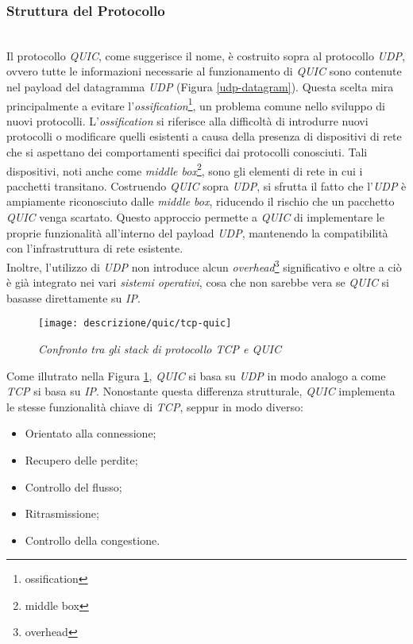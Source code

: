 \subsubsection{Struttura del Protocollo}
~\\ 
\indent Il protocollo \emph{QUIC}, come suggerisce il nome, è costruito sopra al protocollo \emph{UDP}, ovvero tutte le informazioni necessarie al funzionamento di \emph{QUIC} sono contenute nel payload del datagramma \emph{UDP} (Figura \ref{udp-datagram}). 
Questa scelta mira principalmente a evitare l'\emph{ossification}\footnote{\gls{ossification}}, un problema comune nello sviluppo di nuovi protocolli.
L'\emph{ossification} si riferisce alla difficoltà di introdurre nuovi protocolli o modificare quelli esistenti a causa della presenza di dispositivi di rete che si aspettano dei comportamenti specifici dai protocolli conosciuti. Tali dispositivi, noti anche come \emph{middle box}\footnote{\gls{middle box}}, sono gli elementi di rete in cui i pacchetti transitano. 
Costruendo \emph{QUIC} sopra \emph{UDP}, si sfrutta il fatto che l'\emph{UDP} è ampiamente riconosciuto dalle \emph{middle box}, riducendo il rischio che un pacchetto \emph{QUIC} venga scartato. 
Questo approccio permette a \emph{QUIC} di implementare le proprie funzionalità all'interno del payload \emph{UDP}, mantenendo la compatibilità con l'infrastruttura di rete esistente.
\\
Inoltre, l'utilizzo di \emph{UDP} non introduce alcun \emph{overhead}\footnote{\gls{overhead}} significativo e oltre a ciò è già integrato nei vari \emph{sistemi operativi}, cosa che non sarebbe vera se \emph{QUIC} si basasse direttamente su \emph{IP}.
\begin{figure}[!h]
    \centering
    \texttt{[image: descrizione/quic/tcp-quic]}
    \caption{\emph{Confronto tra gli stack di protocollo TCP e QUIC}}
    \label{tcp-quic}
\end{figure}
\noindent Come illutrato nella Figura \ref{tcp-quic}, \emph{QUIC} si basa su \emph{UDP} in modo analogo a come \emph{TCP} si basa su \emph{IP}.
Nonostante questa differenza strutturale, \emph{QUIC} implementa le stesse funzionalità chiave di \emph{TCP}, seppur in modo diverso:
\begin{itemize}
    \item Orientato alla connessione;
    \item Recupero delle perdite;
    \item Controllo del flusso;
    \item Ritrasmissione;
    \item Controllo della congestione.
\end{itemize}
